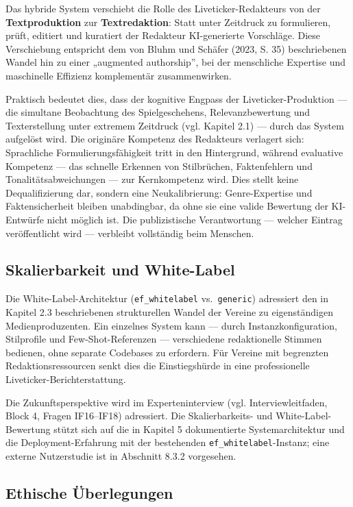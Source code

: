 Das hybride System verschiebt die Rolle des Liveticker-Redakteurs von
der \textbf{Textproduktion} zur \textbf{Textredaktion}: Statt unter
Zeitdruck zu formulieren, prüft, editiert und kuratiert der Redakteur
KI-generierte Vorschläge. Diese Verschiebung entspricht dem von Bluhm
und Schäfer (2023, S. 35) beschriebenen Wandel hin zu einer „augmented
authorship'', bei der menschliche Expertise und maschinelle Effizienz
komplementär zusammenwirken.

Praktisch bedeutet dies, dass der kognitive Engpass der
Liveticker-Produktion --- die simultane Beobachtung des Spielgeschehens,
Relevanzbewertung und Texterstellung unter extremem Zeitdruck (vgl.
Kapitel 2.1) --- durch das System aufgelöst wird. Die originäre
Kompetenz des Redakteurs verlagert sich: Sprachliche
Formulierungsfähigkeit tritt in den Hintergrund, während evaluative
Kompetenz --- das schnelle Erkennen von Stilbrüchen, Faktenfehlern und
Tonalitätsabweichungen --- zur Kernkompetenz wird. Dies stellt keine
Dequalifizierung dar, sondern eine Neukalibrierung: Genre-Expertise und
Faktensicherheit bleiben unabdingbar, da ohne sie eine valide Bewertung
der KI-Entwürfe nicht möglich ist. Die publizistische Verantwortung ---
welcher Eintrag veröffentlicht wird --- verbleibt vollständig beim
Menschen.

\subsection{Skalierbarkeit und
White-Label}\label{skalierbarkeit-und-white-label}

Die White-Label-Architektur (\texttt{ef\_whitelabel}
vs.~\texttt{generic}) adressiert den in Kapitel 2.3 beschriebenen
strukturellen Wandel der Vereine zu eigenständigen Medienproduzenten.
Ein einzelnes System kann --- durch Instanzkonfiguration, Stilprofile
und Few-Shot-Referenzen --- verschiedene redaktionelle Stimmen bedienen,
ohne separate Codebases zu erfordern. Für Vereine mit begrenzten
Redaktionsressourcen senkt dies die Einstiegshürde in eine
professionelle Liveticker-Berichterstattung.

Die Zukunftsperspektive wird im Experteninterview (vgl.
Interviewleitfaden, Block 4, Fragen IF16--IF18) adressiert. Die
Skalierbarkeits- und White-Label-Bewertung stützt sich auf die in
Kapitel 5 dokumentierte Systemarchitektur und die Deployment-Erfahrung
mit der bestehenden \texttt{ef\_whitelabel}-Instanz; eine externe
Nutzerstudie ist in Abschnitt 8.3.2 vorgesehen.

\subsection{Ethische Überlegungen}\label{ethische-uxfcberlegungen}

